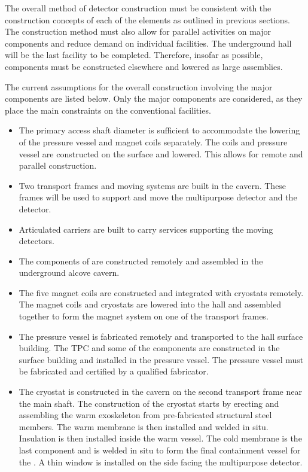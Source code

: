 The overall method of detector construction must be consistent with the construction concepts of each of the elements as outlined in previous sections. The construction method must also allow for parallel activities on major components and reduce demand on individual facilities. The underground hall will be the last facility to be completed. Therefore, insofar as possible, components must be constructed elsewhere and lowered as large assemblies.

The current assumptions for the overall construction involving the major components are listed below.  Only the major components are considered, as they place the main constraints on the conventional facilities.
\begin{itemize}
    \item The primary access shaft diameter is sufficient to  accommodate the lowering of the pressure vessel and magnet coils separately. The coils and pressure vessel are constructed on the surface and lowered. This allows for remote and parallel construction.
    \item Two transport frames and moving systems are built in the cavern.  These frames will be used to support and move the multipurpose detector and the  detector.
    \item Articulated carriers are built to carry services supporting the moving detectors.
    \item The components of   are constructed remotely and assembled in the underground alcove cavern.  
    \item The five magnet coils are constructed and integrated with cryostats remotely.  The magnet coils and cryostats are lowered into the   hall and assembled together to form the magnet system on one of the transport frames.
    \item The pressure vessel is fabricated remotely and transported to the   hall surface building.  The TPC and some of the  components are constructed in the surface building and installed in the pressure vessel.  The pressure vessel must be fabricated and certified by a qualified fabricator.
    \item The  cryostat is constructed in the cavern on the second transport frame near the main shaft.  The construction of the cryostat starts by erecting and assembling the warm exoskeleton from pre-fabricated structural steel members. The warm membrane is then installed and welded in situ. Insulation is then installed inside the warm vessel. The cold membrane is the last component and is welded in situ to form the final containment vessel for the . A thin window is installed on the side facing the multipurpose detector. 

\end{itemize}
